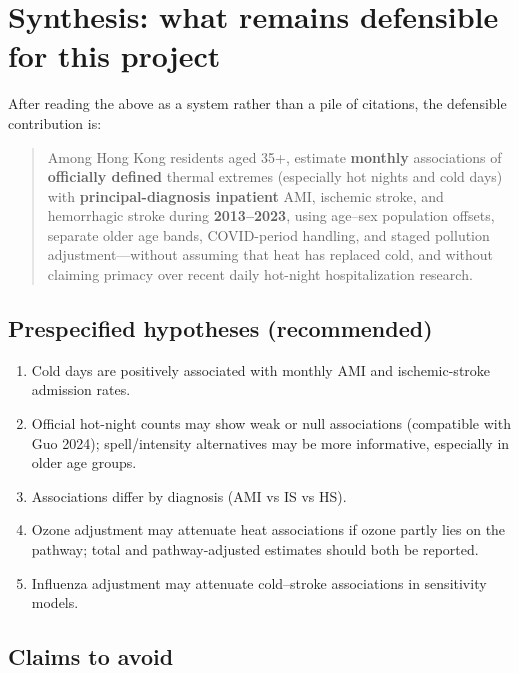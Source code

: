 \documentclass[11pt]{article}
\begin{document}
\section{Synthesis: what remains defensible for this project}

After reading the above as a system rather than a pile of citations, the
defensible contribution is:

\begin{quote}
Among Hong Kong residents aged 35+, estimate \textbf{monthly} associations of
\textbf{officially defined} thermal extremes (especially hot nights and cold days)
with \textbf{principal-diagnosis inpatient} AMI, ischemic stroke, and hemorrhagic
stroke during \textbf{2013--2023}, using age--sex population offsets, separate older
age bands, COVID-period handling, and staged pollution adjustment---without
assuming that heat has replaced cold, and without claiming primacy over recent
daily hot-night hospitalization research.
\end{quote}

\subsection{Prespecified hypotheses (recommended)}

\begin{enumerate}
  \item Cold days are positively associated with monthly AMI and ischemic-stroke
        admission rates.
  \item Official hot-night counts may show weak or null associations (compatible
        with Guo 2024); spell/intensity alternatives may be more informative,
        especially in older age groups.
  \item Associations differ by diagnosis (AMI vs IS vs HS).
  \item Ozone adjustment may attenuate heat associations if ozone partly lies on
        the pathway; total and pathway-adjusted estimates should both be reported.
  \item Influenza adjustment may attenuate cold--stroke associations in
        sensitivity models.
\end{enumerate}

\subsection{Claims to avoid}
\end{document}
